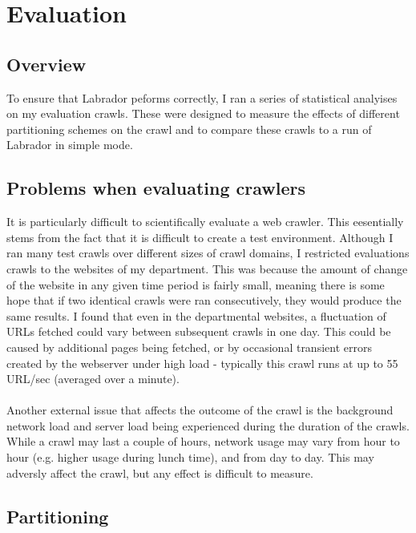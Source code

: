 \chapter{Evaluation}\label{chp-eval}
\section{Overview}
To ensure that Labrador peforms correctly, I ran a series of statistical analyises on my evaluation crawls. These were designed to measure the effects of different partitioning schemes on the crawl and to compare these crawls to a run of Labrador in simple mode.

\section{Problems when evaluating crawlers}\label{sect-evalprobs}
It is particularly difficult to scientifically evaluate a web crawler. This eesentially stems from the fact that it is difficult to create a test environment. Although I ran many test crawls over different sizes of crawl domains, I restricted evaluations crawls to the websites of my department. This was because the amount of change of the website in any given time period is fairly small, meaning there is some hope that if two identical crawls were ran consecutively, they would produce the same results. I found that even in the departmental websites, a fluctuation of URLs fetched could vary between subsequent crawls in one day. This could be caused by additional pages being fetched, or by occasional transient errors created by the webserver under high load - typically this crawl runs at up to 55 URL/sec (averaged over a minute).\\
\ \\
Another external issue that affects the outcome of the crawl is the background network load and server load being experienced during the duration of the crawls. While a crawl may last a couple of hours, network usage may vary from hour to hour (e.g. higher usage during lunch time), and from day to day. This may adversly affect the crawl, but any effect is difficult to measure.

\section{Partitioning}\label{sect-evalpartitioning}
